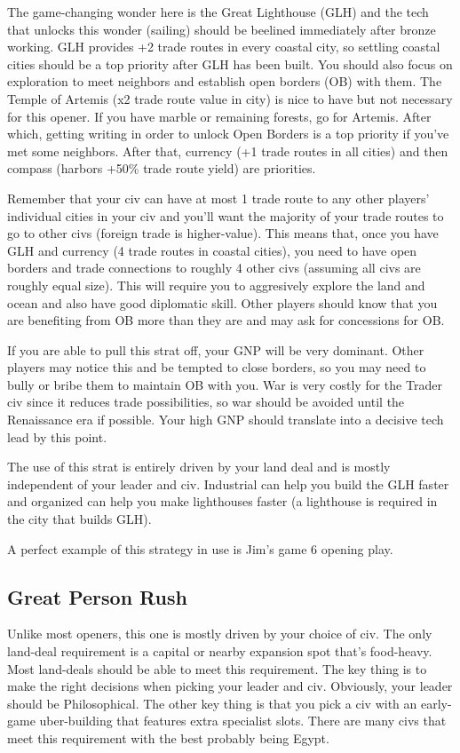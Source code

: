 \documentclass[10pt]{article}
\begin{document}
The game-changing wonder here is the Great Lighthouse (GLH) and the
tech that unlocks this wonder (sailing) should be beelined immediately
after bronze working. GLH provides +2 trade routes in every coastal
city, so settling coastal cities should be a top priority after GLH
has been built. You should also focus on exploration to meet neighbors
and establish open borders (OB) with them.  The Temple of Artemis (x2
trade route value in city) is nice to have but not necessary for this
opener.  If you have marble or remaining forests, go for
Artemis. After which, getting writing in order to unlock Open Borders
is a top priority if you've met some neighbors. After that, currency
(+1 trade routes in all cities) and then compass (harbors +50\% trade
route yield) are priorities.

Remember that your civ can have at most 1 trade route to any other
players' individual cities in your civ and you'll want the majority of
your trade routes to go to other civs (foreign trade is
higher-value). This means that, once you have GLH and currency (4
trade routes in coastal cities), you need to have open borders and
trade connections to roughly 4 other civs (assuming all civs are
roughly equal size). This will require you to aggresively explore the
land and ocean and also have good diplomatic skill. Other players
should know that you are benefiting from OB more than they are and may
ask for concessions for OB.

If you are able to pull this strat off, your GNP will be very
dominant. Other players may notice this and be tempted to close
borders, so you may need to bully or bribe them to maintain OB with
you. War is very costly for the Trader civ since it reduces trade
possibilities, so war should be avoided until the Renaissance era if
possible. Your high GNP should translate into a decisive tech lead by
this point.

The use of this strat is entirely driven by your land deal and is
mostly independent of your leader and civ. Industrial can help you
build the GLH faster and organized can help you make lighthouses
faster (a lighthouse is required in the city that builds GLH).

A perfect example of this strategy in use is Jim's game 6 opening play.

\subsection*{Great Person Rush}

Unlike most openers, this one is mostly driven by your choice of
civ. The only land-deal requirement is a capital or nearby expansion
spot that's food-heavy. Most land-deals should be able to meet this
requirement. The key thing is to make the right decisions when picking
your leader and civ. Obviously, your leader should be
Philosophical. The other key thing is that you pick a civ with an
early-game uber-building that features extra specialist slots. There
are many civs that meet this requirement with the best probably being
Egypt.
\end{document}
